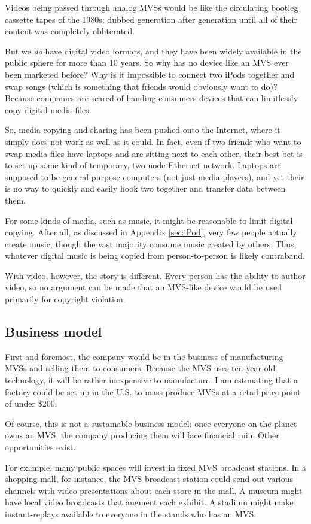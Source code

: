 \documentclass[12pt]{article}
\begin{document}
Videos being passed through analog MVSs would be like the circulating bootleg cassette tapes of the 1980s:  dubbed generation after generation until all of their content was completely obliterated.

But we {\it do} have digital video formats, and they have been widely available in the public sphere for more than 10 years.
So why has no device like an MVS ever been marketed before?
Why is it impossible to connect two iPods together and swap songs (which is something that friends would obviously want to do)?
Because companies are scared of handing consumers devices that can limitlessly copy digital media files.

So, media copying and sharing has been pushed onto the Internet, where it simply does not work as well as it could.
In fact, even if two friends who want to swap media files have laptops and are sitting next to each other, their best bet is to set up some kind of temporary, two-node Ethernet network.
Laptops are supposed to be general-purpose computers (not just media players), and yet their is no way to quickly and easily hook two together and transfer data between them.

For some kinds of media, such as music, it might be reasonable to limit digital copying.
After all, as discussed in Appendix \ref{sec:iPod}, very few people actually create music, though the vast majority consume music created by others.
Thus, whatever digital music is being copied from person-to-person is likely contraband.

With video, however, the story is different.
Every person has the ability to author video, so no argument can be made that an MVS-like device would be used primarily for copyright violation.  


\subsection{Business model}
First and foremost, the company would be in the business of manufacturing MVSs and selling them to consumers.
Because the MVS uses ten-year-old technology, it will be rather inexpensive to manufacture.
I am estimating that a factory could be set up in the U.S. to mass produce MVSs at a retail price point of under \$200. 

Of course, this is not a sustainable business model:  once everyone on the planet owns an MVS, the company producing them will face financial ruin.
Other opportunities exist.

For example, many public spaces will invest in fixed MVS broadcast stations.
In a shopping mall, for instance, the MVS broadcast station could send out various channels with video presentations about each store in the mall.
A museum might have local video broadcasts that augment each exhibit.
A stadium might make instant-replays available to everyone in the stands who has an MVS.
\end{document}
